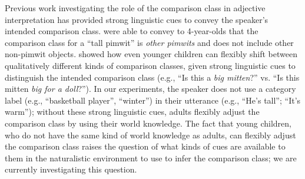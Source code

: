 \documentclass[doc]{apa6}
\newcommand{\mht}[1]{\textcolor{Blue}{[mht: #1]}}
\begin{document}
Previous work investigating the role of the comparison class in adjective interpretation has provided strong linguistic cues to convey the speaker's intended comparison class. 
 were able to convey to 4-year-olds that the comparison class for a ``tall pimwit'' is \emph{other pimwits} and does not include other non-pimwit objects.
 showed how even younger children can flexibly shift between qualitatively different kinds of comparison classes, given strong linguistic cues to distinguish the intended comparison class (e.g., ``Is this a \emph{big mitten}?'' vs. ``Is this mitten \emph{big for a doll}?'').
In our experiments, the speaker does not use a category label (e.g., ``basketball player'', ``winter'') in their utterance (e.g., ``He's tall''; ``It's warm''); without these strong linguistic cues, adults flexibly adjust the comparison class by using their world knowledge. 
The fact that young children, who do not have the same kind of world knowledge as adults, can flexibly adjust the comparison class raises the question of what kinds of cues are available to them in the naturalistic environment to use to infer the comparison class; we are currently investigating this question.

\end{document}
